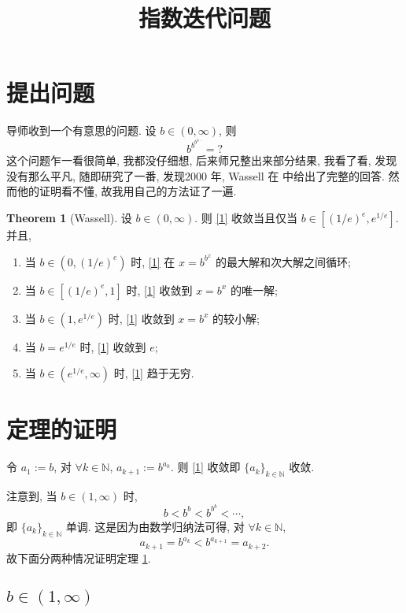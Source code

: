 \documentclass[a4paper,11pt]{article}
\title{指数迭代问题}
\theoremstyle{definition}
\newtheorem{theorem}{Theorem}
\begin{document}
\maketitle

\section{提出问题}

导师收到一个有意思的问题. 设 $ b \in (0, \infty) $, 则
\begin{equation} \label{1}
    b^{b^{b^{b \cdots}}} = ?
\end{equation}
这个问题乍一看很简单, 我都没仔细想, 后来师兄整出来部分结果, 
我看了看, 发现没有那么平凡, 随即研究了一番,
发现2000 年, Wassell 在 \cite{w00} 中给出了完整的回答.
然而他的证明看不懂, 故我用自己的方法证了一遍.

\begin{theorem}[Wassell] \label{2}
    设 $ b \in (0, \infty) $. 则 \eqref{1} 收敛当且仅当 $ b \in [(1/e)^e, e^{1/e}] $. 并且, 
    \begin{enumerate}[{\rm (i)}]
        \item 当 $ b \in (0, (1/e)^e) $ 时, \eqref{1} 在 $ x = b^{b^x} $ 的最大解和次大解之间循环;
        \item 当 $ b \in [(1/e)^e, 1] $ 时, \eqref{1} 收敛到 $ x = b^x $ 的唯一解;
        \item 当 $ b \in (1, e^{1/e}) $ 时, \eqref{1} 收敛到 $ x = b^x $ 的较小解;
        \item 当 $ b = e^{1/e} $ 时, \eqref{1} 收敛到 $ e $;
        \item 当 $ b \in (e^{1/e}, \infty) $ 时, \eqref{1} 趋于无穷.
    \end{enumerate}
\end{theorem}

\section{定理的证明}

令 $ a_1 := b $, 对 $ \forall k \in \mathbb{N} $, $ a_{k + 1} := b^{a_k} $.
则 \eqref{1} 收敛即 $ \{a_k\}_{k \in \mathbb{N}} $ 收敛.

注意到, 当 $ b \in (1, \infty) $ 时,
$$
    b < b^b < b^{b^b} < \cdots,
$$
即 $ \{a_k\}_{k \in \mathbb{N}} $ 单调.
这是因为由数学归纳法可得, 对 $ \forall k \in \mathbb{N} $,
$$
    a_{k + 1} = b^{a_k} < b^{a_{k + 1}} = a_{k + 2}.
$$
故下面分两种情况证明定理 \ref{2}.

\subsection{$b \in (1, \infty)$}
\end{document}

